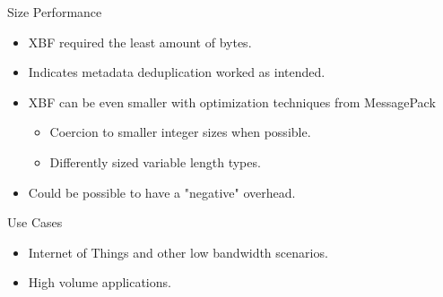\documentclass{beamer}
\begin{document}
\begin{frame}{Size Performance}
	\begin{itemize}
		\item XBF required the least amount of bytes.
		\item Indicates metadata deduplication worked as intended.
		\item XBF can be even smaller with optimization techniques from MessagePack
		      \begin{itemize}
			      \item Coercion to smaller integer sizes when possible.
			      \item Differently sized variable length types.
		      \end{itemize}
		\item Could be possible to have a "negative" overhead.
	\end{itemize}
\end{frame}

\begin{frame}{Use Cases}
	\begin{itemize}
		\item Internet of Things and other low bandwidth scenarios.
		\item High volume applications.
	\end{itemize}
\end{frame}

\backmatter[notitle]
\end{document}
